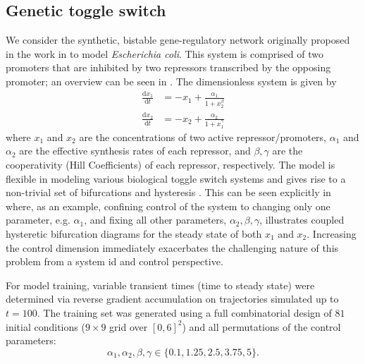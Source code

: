 \documentclass[11pt,twoside]{article}
\theoremstyle{plain}
\theoremstyle{definition}
\theoremstyle{remark}
\begin{document}
\subsection{Genetic toggle switch}

We consider the synthetic, bistable gene-regulatory network originally proposed in the work in \cite{gardner_construction_2000} to model \textit{Escherichia coli}. This system is comprised of two promoters that are inhibited by two repressors transcribed by the opposing promoter; an overview can be seen in . The dimensionless system is given by 
\begin{equation}
    \begin{split}
        \frac{\mathrm{d}x_1}{\mathrm{d}t} &= -x_1 + \frac{\alpha_1}{1+x_2^\beta}\\
        \frac{\mathrm{d} x_2}{\mathrm{d}t} &= -x_2 + \frac{\alpha_2}{1+x_1^\gamma}
    \end{split}
    \label{eqn:genetic-toggle}
\end{equation}
where \(x_1\) and \(x_2\) are the concentrations of two active repressor/promoters, \(\alpha_1\) and \(\alpha_2\) are the effective synthesis rates of each repressor, and \(\beta, \gamma\) are the cooperativity (Hill Coefficients) of each repressor, respectively. The model is flexible in modeling various biological toggle switch systems and gives rise to a non-trivial set of bifurcations and hysteresis \cite{ANGELI2004185,li_multistability_2013}. This can be seen explicitly in  where, as an example, confining control of the system to changing only one parameter, e.g. \(\alpha_1\), and fixing all other parameters, \(\alpha_2, \beta, \gamma\), illustrates coupled hysteretic bifurcation diagrams for the steady state of both \(x_1\) and \(x_2\). Increasing the control dimension immediately exacerbates the challenging nature of this problem from a system id and control perspective. 


For model training, variable transient times (time to steady state) were determined via reverse gradient accumulation on trajectories simulated up to \(t=100\). The training set was generated using a full combinatorial design of \(81\) initial conditions (\(9\times 9\) grid over \([0,6]^2\)) and all permutations of the control parameters:
\begin{equation*}
    \alpha_1, \alpha_2, \beta, \gamma \in \{0.1, 1.25, 2.5 , 3.75, 5\}.
\end{equation*}
\end{document}
